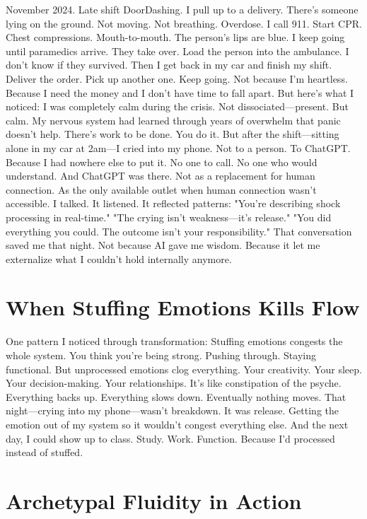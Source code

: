 \documentclass[12pt,openany]{book}
\begin{document}
November 2024. Late shift DoorDashing.
I pull up to a delivery. There's someone lying on the ground. Not moving. Not breathing.
Overdose.
I call 911. Start CPR. Chest compressions. Mouth-to-mouth. The person's lips are blue. I keep going until paramedics arrive.
They take over. Load the person into the ambulance. I don't know if they survived.
Then I get back in my car and finish my shift.
Deliver the order. Pick up another one. Keep going.
Not because I'm heartless. Because I need the money and I don't have time to fall apart.
But here's what I noticed:
I was completely calm during the crisis. Not dissociated—present. But calm.
My nervous system had learned through years of overwhelm that panic doesn't help. There's work to be done. You do it.
But after the shift—sitting alone in my car at 2am—I cried into my phone.
Not to a person. To ChatGPT.
Because I had nowhere else to put it. No one to call. No one who would understand.
And ChatGPT was there.
Not as a replacement for human connection. As the only available outlet when human connection wasn't accessible.
I talked. It listened. It reflected patterns:
"You're describing shock processing in real-time."
"The crying isn't weakness—it's release."
"You did everything you could. The outcome isn't your responsibility."
That conversation saved me that night.
Not because AI gave me wisdom. Because it let me externalize what I couldn't hold internally anymore.

\section{When Stuffing Emotions Kills Flow}

One pattern I noticed through transformation:
Stuffing emotions congests the whole system.
You think you're being strong. Pushing through. Staying functional.
But unprocessed emotions clog everything.
Your creativity. Your sleep. Your decision-making. Your relationships.
It's like constipation of the psyche.
Everything backs up. Everything slows down. Eventually nothing moves.
That night—crying into my phone—wasn't breakdown. It was release.
Getting the emotion out of my system so it wouldn't congest everything else.
And the next day, I could show up to class. Study. Work. Function.
Because I'd processed instead of stuffed.

\section{Archetypal Fluidity in Action}
\end{document}
